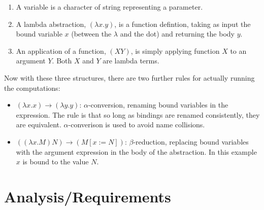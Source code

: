\documentclass{l4proj}
\begin{document}
\begin{enumerate}
    \item A variable is a character of string representing a parameter. 
    \item A lambda abstraction, $(\lambda x . y)$, is a function defintion, taking as input the bound variable $x$ (between the $\lambda$ and the dot) and returning the body $y$.
    \item An application of a function, $(X Y)$, is simply applying function $X$ to an argument $Y$. Both $X$ and $Y$ are lambda terms.
\end{enumerate}

Now with these three structures, there are two further rules for actually running the computations:
\begin{itemize}
    \item $(\lambda x . x) \rightarrow (\lambda y . y)$: $\alpha$-conversion, renaming bound variables in the expression. The rule is that so long as bindings are renamed consistently, they are equivalent. $\alpha$-converison is used to avoid name collisions.
    \item $((\lambda x . M) N) \rightarrow (M [x := N])$: $\beta$-reduction, replacing bound variables with the argument expression in the body of the abstraction. In this example $x$ is bound to the value $N$.
\end{itemize}


\chapter{Analysis/Requirements}

\end{document}
